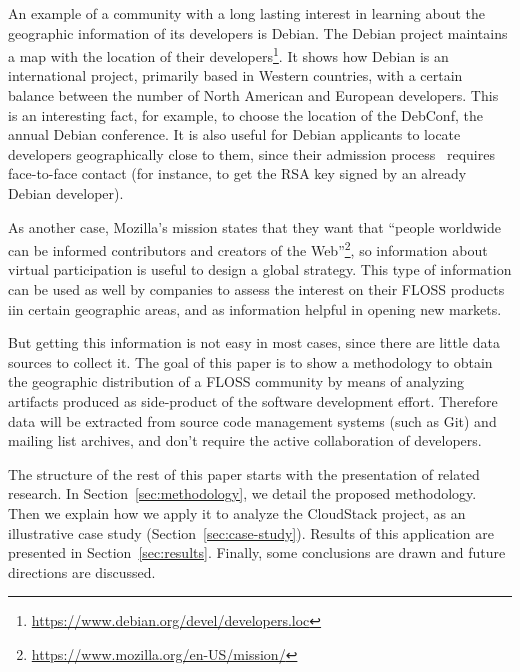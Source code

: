 \documentclass{sig-alternate-05-2015}
\begin{document}
An example of a community with a long lasting interest in learning about the geographic information of its developers is Debian. The Debian project maintains a map with the location of their developers\footnote{\url{https://www.debian.org/devel/developers.loc}}. %
It shows how Debian is an international project, primarily based in Western countries, with a certain balance between the number of North American and European developers. This is an interesting fact, for example, to choose the location of the DebConf, the annual Debian conference. It is also useful for Debian applicants to locate developers geographically close to them, since their admission process~\cite{robles2005evolution} requires face-to-face contact (for instance,
to get the RSA key signed by an already Debian developer). 


As another case, Mozilla's mission states that they want that ``people worldwide can be informed contributors and creators of the Web''\footnote{\url{https://www.mozilla.org/en-US/mission/}}, so information about virtual participation is useful to design a global strategy. This type of information can be used as well by companies to assess the interest on their FLOSS products iin certain geographic areas, and as information helpful in opening new markets.

But getting this information is not easy in most cases, since there are little data sources to collect it. The goal of this paper is to show a methodology to obtain the geographic distribution of a FLOSS community by means of analyzing artifacts produced as side-product of the software development effort. Therefore data will be extracted from source code management systems (such as Git) and mailing list archives, and don't require the active collaboration of developers.

The structure of the rest of this paper starts with the presentation of related research.
In Section~\ref{sec:methodology}, we detail the proposed methodology. Then we explain how we apply it to analyze the CloudStack project, as an illustrative case study (Section~\ref{sec:case-study}). Results of this application are presented in Section~\ref{sec:results}. Finally, some conclusions are drawn and future directions are discussed.
\end{document}
